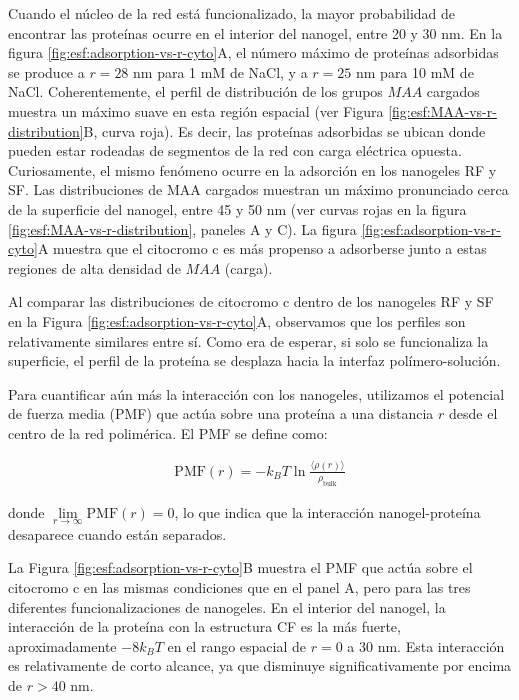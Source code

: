 Cuando el n\'ucleo de la red est\'a funcionalizado, la mayor probabilidad de encontrar las prote\'inas ocurre en el interior del nanogel, entre 20 y 30 nm. En la figura \ref{fig:esf:adsorption-vs-r-cyto}A, el n\'umero m\'aximo de prote\'inas adsorbidas se produce a $r=28$ nm para 1 mM de NaCl, y a $r=25$ nm para 10 mM de NaCl. Coherentemente, el perfil de distribuci\'on de los grupos $MAA$ cargados muestra un m\'aximo suave en esta regi\'on espacial (ver Figura \ref{fig:esf:MAA-vs-r-distribution}B, curva roja). Es decir, las prote\'inas adsorbidas se ubican donde pueden estar rodeadas de segmentos de la red con carga el\'ectrica opuesta. Curiosamente, el mismo fen\'omeno ocurre en la adsorci\'on en los nanogeles RF y SF. Las distribuciones de MAA cargados muestran un m\'aximo pronunciado cerca de la superficie del nanogel, entre 45 y 50 nm (ver curvas rojas en la figura \ref{fig:esf:MAA-vs-r-distribution}, paneles A y C). La figura \ref{fig:esf:adsorption-vs-r-cyto}A muestra que el citocromo c es m\'as propenso a adsorberse junto a estas regiones de alta densidad de $MAA$ (carga).



Al comparar las distribuciones de citocromo c dentro de los nanogeles RF y SF en la Figura \ref{fig:esf:adsorption-vs-r-cyto}A, observamos que los perfiles son relativamente similares entre s\'i. Como era de esperar, si solo se funcionaliza la superficie, el perfil de la prote\'ina se desplaza hacia la interfaz pol\'imero-soluci\'on.

Para cuantificar a\'un m\'as la interacci\'on con los nanogeles, utilizamos el potencial de fuerza media (PMF) que act\'ua sobre una prote\'ina a una distancia $r$ desde el centro de la red polim\'erica. El PMF se define como:

\begin{align}
	\text{PMF}(r) = -k_B T \ln \frac{\langle \rho(r)\rangle}{\rho_{\text{bulk}}}
\end{align}

donde $\lim\limits_{r\to \infty}\text{PMF}(r)=0$, lo que indica que la interacci\'on nanogel-prote\'ina desaparece cuando est\'an separados.

La Figura \ref{fig:esf:adsorption-vs-r-cyto}B muestra el PMF que act\'ua sobre el citocromo c en las mismas condiciones que en el panel A, pero para las tres diferentes funcionalizaciones de nanogeles. En el interior del nanogel, la interacci\'on de la prote\'ina con la estructura CF es la m\'as fuerte, aproximadamente $-8k_B T$ en el rango espacial de $r=0$ a 30 nm. Esta interacci\'on es relativamente de corto alcance, ya que disminuye significativamente por encima de $r > 40$ nm.

